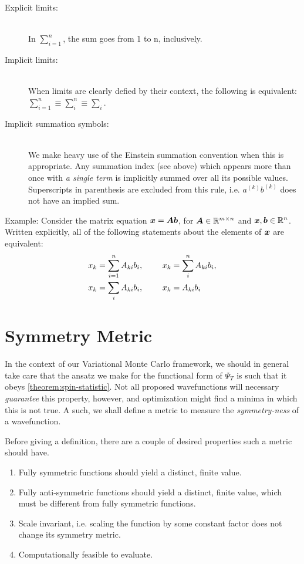 \documentclass[Thesis.tex]{subfiles}
\begin{document}
\begin{description}
\item[Explicit limits:] \hfill\\
  In $\sum_{i=1}^n$, the sum goes from 1 to n, inclusively.
\item[Implicit limits:]\hfill\\
  When limits are clearly defied by their context, the following is equivalent:
  $\sum_{i=1}^n \equiv \sum_{i}^n\equiv \sum_i$.
\item[Implicit summation symbols:]\hfill\\
  We make heavy use of the Einstein summation convention when this is
  appropriate. Any summation index (see above) which appears more than once with
  \emph{a single term} is implicitly summed over all its possible values.
  Superscripts in parenthesis are excluded from this rule, i.e. $a^{(k)}b^{(k)}$
  does not have an implied sum.
\end{description}

Example: Consider the matrix equation $\bm{x} = \bm{A}\bm{b}$, for
$\bm{A}\in\mathbb{R}^{m\times n}$ and $\bm{x}, \bm{b} \in \mathbb{R}^n$. Written
explicitly, all of the following statements about the elements of $\bm{x}$ are equivalent:
\begin{align}
  \begin{split}
  x_k &= \sum_{i=1}^n A_{ki}b_i,\qq{ } x_k = \sum_{i}^n A_{ki}b_i,\\
  x_k &= \sum_{i} A_{ki}b_i,\qq{ } x_k = A_{ki}b_i
  \end{split}
\end{align}
\section{Symmetry Metric}

In the context of our Variational Monte Carlo framework, we should in general
take care that the ansatz we make for the functional form of $\Psi_T$ is such
that it obeys \autoref{theorem:spin-statistic}. Not all proposed wavefunctions
will necessary \emph{guarantee} this property, however, and optimization might
find a minima in which this is not true. A such, we shall define a metric to
measure the \emph{symmetry-ness} of a wavefunction.

Before giving a definition, there are a couple of desired properties such a
metric should have.

\begin{enumerate}
    \item Fully symmetric functions should yield a distinct, finite value.
    \item Fully anti-symmetric functions should yield a distinct, finite value,
        which must be different from fully symmetric functions.
    \item Scale invariant, i.e. scaling the function by
        some constant factor does not change its symmetry metric.
    \item Computationally feasible to evaluate.
\end{enumerate}
\end{document}
